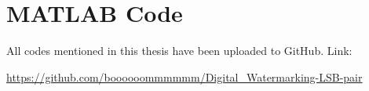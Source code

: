 
\chapter{MATLAB Code}

All codes mentioned in this thesis have been uploaded to GitHub. Link: 

\href{https://github.com/boooooommmmmm/Digital_Watermarking-LSB-pair}{https://github.com/boooooommmmmm/Digital\_Watermarking-LSB-pair}